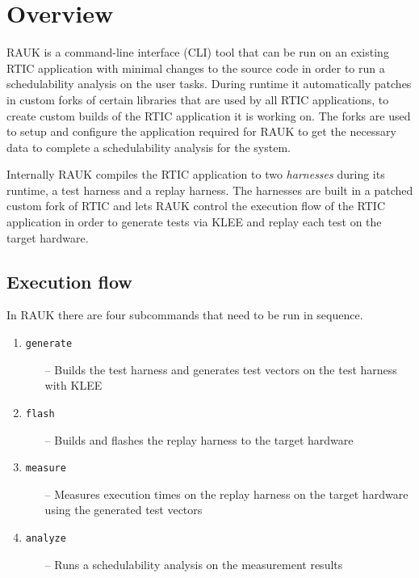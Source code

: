 \section{Overview}
RAUK is a command-line interface (CLI) tool that can be run on an existing
RTIC application with minimal changes to the source code in order to run a
schedulability analysis on the user tasks. During runtime it automatically
patches in custom forks of certain libraries that are used by all RTIC
applications, to create custom builds of the RTIC application it is working on.
The forks are used to setup and configure the application required for RAUK to
get the necessary data to complete a schedulability analysis for the system.

Internally RAUK compiles the RTIC application to two \emph{harnesses} during
its runtime, a test harness and a replay harness. The harnesses are built in a
patched custom fork of RTIC and lets RAUK control the execution flow of the
RTIC application in order to generate tests via KLEE and replay each test on
the target hardware.

\subsection{Execution flow}
In RAUK there are four subcommands that need to be run in sequence.

\begin{enumerate}
    \item \texttt{generate}
    \begin{itemize}
        \item [--] Builds the test harness and generates test vectors on the test
            harness with KLEE
    \end{itemize}
    \item \texttt{flash}
    \begin{itemize}
        \item [--] Builds and flashes the replay harness to the target hardware
    \end{itemize}
    \item \texttt{measure}
    \begin{itemize}
        \item [--] Measures execution times on the replay harness on the target
            hardware using the generated test vectors
    \end{itemize}
    \item \texttt{analyze}
    \begin{itemize}
        \item [--] Runs a schedulability analysis on the measurement results
    \end{itemize}
\end{enumerate}

